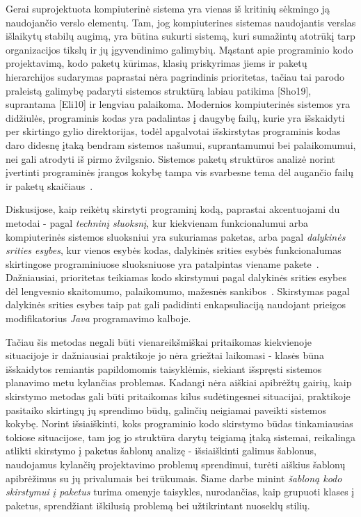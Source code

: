 Gerai suprojektuota kompiuterinė sistema yra vienas iš kritinių sėkmingo ją naudojančio verslo
elementų.
Tam, jog kompiuterines sistemas naudojantis verslas išlaikytų stabilų augimą, yra būtina sukurti sistemą, kuri sumažintų
atotrūkį tarp organizacijos tikslų ir jų įgyvendinimo galimybių.
Mąstant apie programinio kodo
projektavimą, kodo paketų kūrimas, klasių priskyrimas jiems ir paketų hierarchijos sudarymas paprastai
nėra pagrindinis prioritetas, tačiau tai parodo praleistą galimybę padaryti sistemos struktūrą labiau
patikima [Sho19], suprantama [Eli10] ir lengviau palaikoma.
Modernios kompiuterinės sistemos yra didžiulės, programinis kodas yra padalintas į daugybę failų,
kurie yra išskaidyti per skirtingo gylio direktorijas, todėl apgalvotai išskirstytas programinis
kodas daro didesnę įtaką bendram sistemos našumui, suprantamumui bei palaikomumui, nei gali atrodyti iš pirmo žvilgsnio.
Sistemos paketų struktūros analizė norint įvertinti programinės įrangos kokybę
tampa vis svarbesne tema dėl augančio failų ir paketų skaičiaus~\cite{DesignMetrics}.

Diskusijose, kaip reikėtų skirstyti programinį kodą, paprastai akcentuojami du metodai - pagal \textit{techninį sluoksnį},
kur kiekvienam funkcionalumui arba kompiuterinės sistemos sluoksniui yra sukuriamas paketas,
arba pagal \textit{dalykinės srities esybes}, kur vienos esybės kodas, dalykinės srities
esybės funkcionalumas skirtingose programiniuose sluoksniuose yra patalpintas viename pakete~\cite{PackagingWays}.
Dažniausiai, prioritetas teikiamas kodo skirstymui pagal dalykinės srities esybes~\cite{DomainDrivenDesign} dėl lengvesnio skaitomumo,
palaikomumo, mažesnės sankibos~\cite{DivideByDomain}.
Skirstymas pagal dalykinės srities esybes taip pat gali padidinti
enkapsuliaciją naudojant prieigos modifikatorius \textit{Java} programavimo kalboje.

Tačiau šis metodas negali būti vienareikšmiškai pritaikomas kiekvienoje situacijoje ir dažniausiai praktikoje jo nėra griežtai laikomasi -
klasės būna išskaidytos remiantis papildomomis taisyklėmis,
siekiant išspręsti sistemos planavimo metu kylančias problemas.
Kadangi nėra aiškiai apibrėžtų gairių, kaip skirstymo metodas gali būti pritaikomas kilus sudėtingesnei situacijai, praktikoje pasitaiko skirtingų
jų sprendimo būdų, galinčių neigiamai paveikti sistemos kokybę.
Norint išsiaiškinti, koks programinio kodo skirstymo būdas tinkamiausias tokiose situacijose,
tam jog jo struktūra darytų teigiamą įtaką sistemai, reikalinga atlikti skirstymo į paketus šablonų analizę -
išsiaiškinti galimus šablonus, naudojamus kylančių projektavimo problemų sprendimui, turėti aiškius šablonų apibrėžimus su jų
privalumais bei trūkumais.
Šiame darbe minint \textit{šabloną kodo skirstymui į paketus} turima omenyje taisykles,
nurodančias, kaip grupuoti klases į paketus, sprendžiant iškilusią problemą bei užtikrintant nuoseklų stilių.

